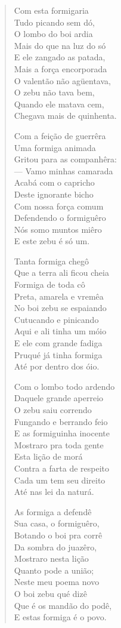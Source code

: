 \begin{verse}
Com esta formigaria\\
Tudo picando sem dó,\\
O lombo do boi ardia\\
Mais do que na luz do só\\
E ele zangado as patada,\\
Mais a força encorporada\\
O valentão não agüentava,\\
O zebu não tava bem,\\
Quando ele matava cem,\\
Chegava mais de quinhenta.

Com a feição de guerrêra\\
Uma formiga animada\\
Gritou para as companhêra:\\
--- Vamo minhas camarada\\
Acabá com o capricho\\
Deste ignorante bicho\\
Com nossa força comum\\
Defendendo o formiguêro\\
Nós somo muntos miêro\\
E este zebu é só um.

Tanta formiga chegô\\
Que a terra ali ficou cheia\\
Formiga de toda cô\\
Preta, amarela e vremêa\\
No boi zebu se espaiando\\
Cutucando e pinicando\\
Aqui e ali tinha um móio\\
E ele com grande fadiga\\
Pruqué já tinha formiga\\
Até por dentro dos óio.

Com o lombo todo ardendo\\
Daquele grande aperreio\\
O zebu saiu correndo\\
Fungando e berrando feio\\
E as formiguinha inocente\\
Mostraro pra toda gente\\
Esta lição de morá\\
Contra a farta de respeito\\
Cada um tem seu direito\\
Até nas lei da naturá.

As formiga a defendê\\
Sua casa, o formiguêro,\\
Botando o boi pra corrê\\
Da sombra do juazêro,\\
Mostraro nesta lição\\
Quanto pode a união;\\
Neste meu poema novo\\
O boi zebu qué dizê\\
Que é os mandão do podê,\\
E estas formiga é o povo.
\end{verse}

